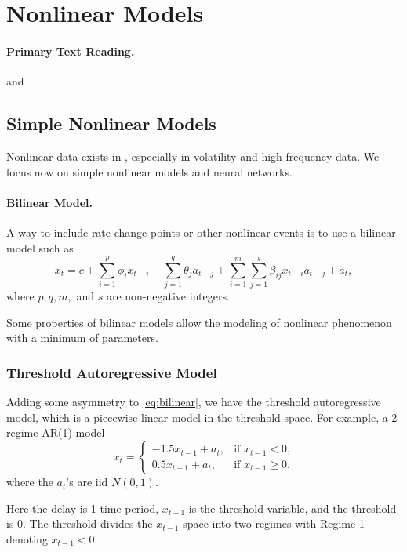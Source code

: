 \section{Nonlinear Models}
\paragraph{Primary Text Reading.}  and 
\subsection{Simple Nonlinear Models}

Nonlinear data exists in \fts{}, especially in volatility and high-frequency data. We focus now on simple nonlinear models and neural networks. 

\paragraph{Bilinear Model.} A way to include rate-change points or other nonlinear events is to use a bilinear model such as
\begin{equation}
x_t = c+ \sum^p_{i=1} \phi_i x_{t-i} - \sum^q_{j=1} \theta_j a_{t-j} + \sum^m_{i=1} \sum^s_{j=1} \beta_{ij} x_{t-i} a_{t-j} + a_t,
\label{eq:bilinear}
\end{equation}
where $p,q,m,$ and $s$ are non-negative integers.

Some properties of bilinear models allow the modeling of nonlinear phenomenon with a minimum of parameters. 

\subsubsection{Threshold Autoregressive Model} Adding some asymmetry to \eqref{eq:bilinear}, we have the threshold autoregressive model, which is a piecewise linear model in the threshold space. For example, a 2-regime AR(1) model 
\[
x_t =
\begin{cases}
-1.5x_{t-1} + a_t, &\text{if $x_{t-1}<0$,} \\
0.5x_{t-1} + a_t, &\text{if $x_{t-1} \ge 0$,}
\end{cases}
\]
where the $a_{t}$'s are iid $N(0, 1)$. 

Here the delay is 1 time period, $x_{t-1}$ is the threshold variable, and 
the threshold is 0. The threshold divides the $x_{t-1}$ space into two 
regimes with Regime 1 denoting $x_{t-1} < 0$.

